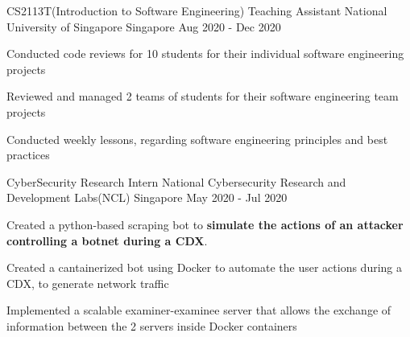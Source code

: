 

\begin{cventries}


  \cventry
  {CS2113T(Introduction to Software Engineering) Teaching Assistant} %
  {National University of Singapore} %
  {Singapore} %
  {Aug 2020 - Dec 2020} %
  {
    \begin{cvitems}
      \item {Conducted code reviews for 10 students for their individual software engineering projects}
      \item {Reviewed and managed 2 teams of students for their software engineering team projects}
      \item {Conducted weekly lessons, regarding software engineering principles and best practices}
    \end{cvitems}
  }

  \cventry
  {CyberSecurity Research Intern} %
  {National Cybersecurity Research and Development Labs(NCL)} %
  {Singapore} %
  {May 2020 - Jul 2020} %
  {
    \begin{cvitems}
      \item {Created a python-based scraping bot to \textbf{simulate the actions of an attacker controlling a botnet during a CDX}.}
      \item {Created a cantainerized bot using Docker to automate the user actions during a CDX, to generate network traffic}
      \item {Implemented a scalable examiner-examinee server that allows the exchange of information between the 2 servers inside Docker containers}
    \end{cvitems}
  }


\end{cventries}
